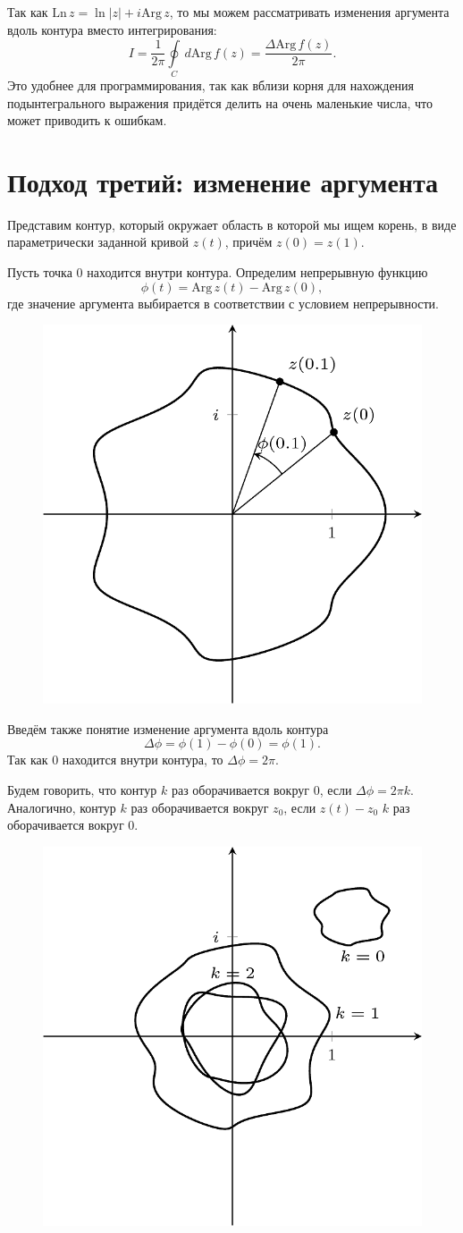 \documentclass{ncc}
\begin{document}
Так как \( \mathrm{Ln\,} z = \ln |z| + i\mathrm{Arg\,} z \), то мы можем рассматривать изменения аргумента вдоль контура вместо интегрирования:
\[
    I = \frac{1}{2\pi}\oint\limits_{C}\, d \mathrm{Arg\,} f(z) = \frac{\Delta\mathrm{Arg\,}f(z)}{2\pi}.
\]
Это удобнее для программирования, так как вблизи корня для нахождения подынтегрального выражения придётся делить на очень маленькие числа, что может приводить к ошибкам.

\section{Подход третий: изменение аргумента}

Представим контур, который окружает область в которой мы ищем корень, в виде
параметрически заданной кривой \( z(t) \), причём \( z(0) = z(1) \).

Пусть точка \( 0 \) находится внутри контура. Определим непрерывную функцию
\[
    \phi(t) = \mathrm{Arg\,} z(t) - \mathrm{Arg\,} z(0),
\]
где значение аргумента выбирается в соответствии с условием непрерывности.
\begin{figure}[h]
\center
\includegraphics[width=.5\textwidth]{2015-10-26-complex-roots-contour.png}
\end{figure}
Введём также понятие изменение аргумента вдоль контура
\[
    \Delta \phi = \phi(1) - \phi(0) = \phi(1).
\]
Так как \(0\) находится внутри контура, то \( \Delta\phi = 2\pi \).

Будем говорить, что контур \( k \) раз оборачивается вокруг \(0\), если
\( \Delta\phi = 2\pi k \). Аналогично, контур \( k \) раз оборачивается
вокруг \( z_0 \), если \( z(t) - z_0 \) \(k\) раз оборачивается вокруг 0.
\begin{figure}[h]
\center
\includegraphics[width=.5\textwidth]{2015-10-26-complex-roots-rotations.png}
\end{figure}
\end{document}

